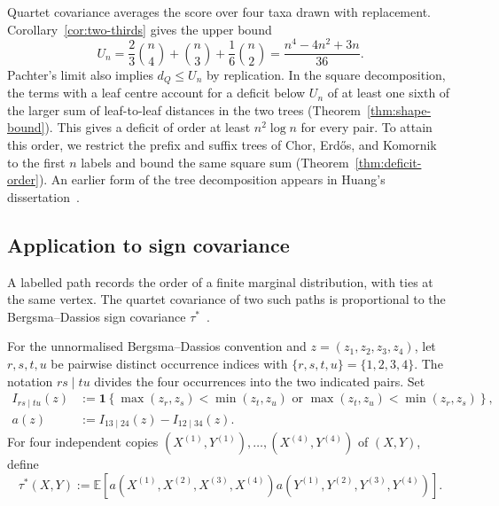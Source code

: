 \documentclass[12pt]{article}
\begin{document}
Quartet covariance averages the score over four taxa drawn with
replacement. Corollary~\ref{cor:two-thirds} gives the upper bound
\[
 U_n=\frac23\binom n4+\binom n3+\frac16\binom n2
     =\frac{n^4-4n^2+3n}{36}.
\]
Pachter's limit also implies $d_Q\le U_n$ by replication.
In the square decomposition, the terms with a leaf centre account
for a deficit below $U_n$ of at least one sixth of the larger sum of
leaf-to-leaf distances in the two trees (Theorem~\ref{thm:shape-bound}).
This gives a deficit of order at least $n^2\log n$ for every pair.
To attain this order, we restrict the prefix and suffix trees
of Chor, Erd\H{o}s, and Komornik~\cite{ChorErdosKomornik2019}
to the first $n$ labels and bound the same square sum
(Theorem~\ref{thm:deficit-order}). An earlier form of the tree
decomposition appears in Huang's dissertation~\cite{Huang2017}.

\subsection{Application to sign covariance}

A labelled path records the order of a finite marginal distribution,
with ties at the same vertex. The quartet covariance of two such paths
is proportional to the Bergsma--Dassios sign covariance
$\tau^*$~\cite{BergsmaDassios2014}.

For the unnormalised Bergsma--Dassios convention and
$z=(z_1,z_2,z_3,z_4)$, let $r,s,t,u$ be pairwise distinct occurrence indices
with $\{r,s,t,u\}=\{1,2,3,4\}$. The notation $rs\mid tu$ divides the four
occurrences into the two indicated pairs.  Set
\begin{equation}\label{eq:sign-covariance-kernel}
\begin{aligned}
I_{rs\mid tu}(z)&:=\mathbf{1}\!\left\{
\max(z_r,z_s)<\min(z_t,z_u)\text{ or }
\max(z_t,z_u)<\min(z_r,z_s)\right\},\\
a(z)&:=I_{13\mid24}(z)-I_{12\mid34}(z).
\end{aligned}
\end{equation}
For four independent copies
$(X^{(1)},Y^{(1)}),\ldots,(X^{(4)},Y^{(4)})$ of $(X,Y)$, define
\begin{equation}\label{eq:sign-covariance-population}
\tau^*(X,Y):=\mathbb E\!\left[
a(X^{(1)},X^{(2)},X^{(3)},X^{(4)})
a(Y^{(1)},Y^{(2)},Y^{(3)},Y^{(4)})\right].
\end{equation}
\end{document}
